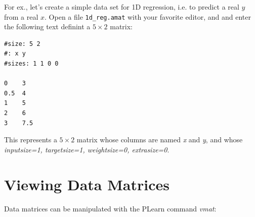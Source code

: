 \documentclass[11pt]{book}
\begin{document}
For ex., let's create a simple data set for 1D regression, i.e. to predict a real $y$ from a real $x$.
Open a file \verb!1d_reg.amat! with your favorite editor, and and enter the following text definint a 
$5 \times 2$ matrix:
\begin{verbatim}
#size: 5 2
#: x y     
#sizes: 1 1 0 0

0    3
0.5  4
1    5
2    6
3    7.5
\end{verbatim}

This represents a $5 \times 2$ matrix whose columns are named {\em x} and
{\em y}, and whose {\em inputsize=1, targetsize=1, weightsize=0, extrasize=0}.

\section{Viewing Data Matrices}

Data matrices can be manipulated with the PLearn command {\em vmat}:
\end{document}

